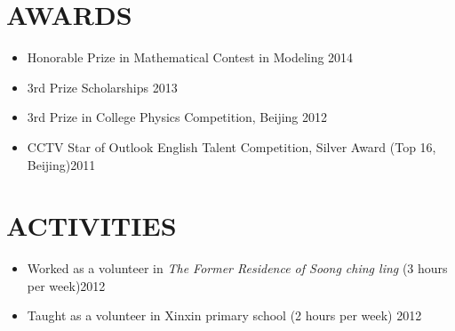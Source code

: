 \documentclass[margin,10pt]{res} %
\begin{document}
\begin{resume}


\section{AWARDS}
\begin{itemize}\itemsep -12pt
    \item Honorable Prize in Mathematical Contest in Modeling {\hfill 2014}\\
    \item 3rd Prize Scholarships {\hfill 2013}\\

    \item 3rd Prize in College Physics Competition, Beijing {\hfill 2012}\\
    \item CCTV Star of Outlook English Talent Competition, Silver Award (Top 16, Beijing){\hfill 2011}
\end{itemize}

\section{ACTIVITIES}
\begin{itemize}\itemsep -12pt
\item Worked as a volunteer in {\it The Former Residence of Soong ching ling} (3 hours per week){\hfill 2012}\\
\item Taught as a volunteer in Xinxin primary school (2 hours per week) {\hfill  2012}\\
\end{itemize}

\end{resume}
\end{document}
